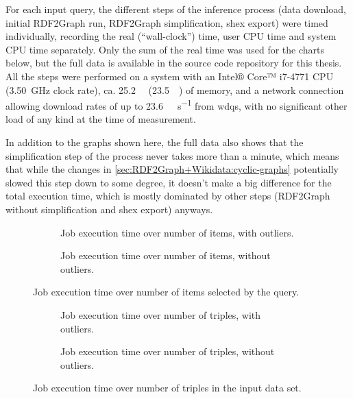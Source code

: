 For each input query,
the different steps of the inference process
(data download, initial \gls{RDF2Graph} run, \gls{RDF2Graph} simplification, \gls{shex} export)
were timed individually,
recording the real (“wall-clock”) time, user CPU time and system CPU time separately.
Only the sum of the real time was used for the charts below,
but the full data is available in the source code repository for this thesis.
All the steps were performed on a system
with an Intel® Core™ i7-4771 CPU (\SI{3.50}{\giga\hertz} clock rate),
ca. \SI{25.2}{\giga\byte} (\SI{23.5}{\gibi\byte}) of memory,
and a network connection allowing download rates of up to \SI{23.6}{\mebi\byte\per\second} from \gls{wdqs},
with no significant other load of any kind at the time of measurement.

In addition to the graphs shown here,
the full data also shows that the simplification step of the process
never takes more than a minute,
which means that while the changes in \cref{sec:RDF2Graph+Wikidata:cyclic-graphs} potentially slowed this step down to some degree,
it doesn’t make a big difference for the total execution time,
which is mostly dominated by other steps
(\gls{RDF2Graph} without simplification and \gls{shex} export)
anyways.

\begin{figure}[ht]
  \begin{subfigure}{\textwidth}
    \centering
    
    \caption{Job execution time over number of \glspl{item}, with outliers.}
    \label{fig:jobs-over-entities-with-outliers}
  \end{subfigure}
  \begin{subfigure}{\textwidth}
    \centering
    
    \caption{Job execution time over number of \glspl{item}, without outliers.}
    \label{fig:jobs-over-entities-without-outliers}
  \end{subfigure}
  \caption{Job execution time over number of \glspl{item} selected by the query.}
  \label{fig:jobs-over-entities}
\end{figure}

\begin{figure}[ht]
  \begin{subfigure}{\textwidth}
    \centering
    
    \caption{Job execution time over number of \glspl{triple}, with outliers.}
    \label{fig:jobs-over-triples-with-outliers}
  \end{subfigure}
  \begin{subfigure}{\textwidth}
    \centering
    
    \caption{Job execution time over number of \glspl{triple}, without outliers.}
    \label{fig:jobs-over-triples-without-outliers}
  \end{subfigure}
  \caption{Job execution time over number of \glspl{triple} in the input data set.}
  \label{fig:jobs-over-triples}
\end{figure}


